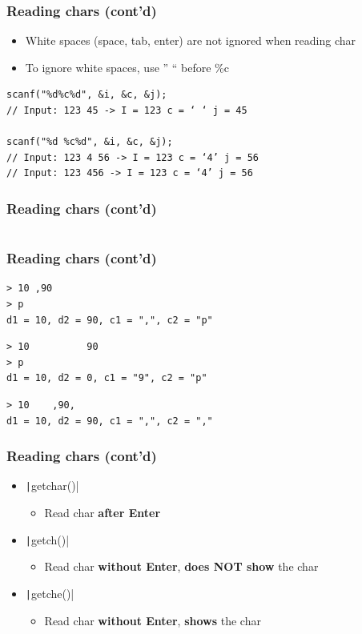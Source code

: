 \documentclass{../c-lecture}
\begin{document}
\begin{frame}[fragile]
  \frametitle{Reading chars (cont’d)}
  \begin{itemize}
    \item White spaces (space, tab, enter) are not ignored when reading char
    \item To ignore white spaces, use '' `` before \%c
  \end{itemize}
  \begin{verbatim}
scanf("%d%c%d", &i, &c, &j);
// Input: 123 45 -> I = 123 c = ‘ ‘ j = 45

scanf("%d %c%d", &i, &c, &j);
// Input: 123 4 56 -> I = 123 c = ‘4’ j = 56
// Input: 123 456 -> I = 123 c = ‘4’ j = 56
  \end{verbatim}
\end{frame}

\begin{frame}[fragile]
  \frametitle{Reading chars (cont’d)}
  \scriptsize
  \inputminted[bgcolor=Black]{c}{./src/read-with-whitespaces.c}
\end{frame}

\begin{frame}[fragile]
  \frametitle{Reading chars (cont’d)}
  \begin{verbatim}
> 10 ,90
> p
d1 = 10, d2 = 90, c1 = ",", c2 = "p"
  \end{verbatim}
  \begin{verbatim}
> 10          90
> p
d1 = 10, d2 = 0, c1 = "9", c2 = "p"
  \end{verbatim}
  \begin{verbatim}
> 10    ,90,
d1 = 10, d2 = 90, c1 = ",", c2 = ","
  \end{verbatim}
\end{frame}

\begin{frame}
  \frametitle{Reading chars (cont’d)}
  \begin{itemize}
    \item \texttt|getchar()|
    \begin{itemize}
      \item Read char \textbf{\color{Orange} after Enter}
    \end{itemize}
    \item \texttt|getch()|
    \begin{itemize}
      \item
        Read char \textbf{\color{Orange} without Enter},
        \textbf{\color{LimeGreen} does NOT show} the char
    \end{itemize}
    \item \texttt|getche()|
    \begin{itemize}
      \item
        Read char \textbf{\color{Orange} without Enter},
        \textbf{\color{LimeGreen} shows} the char
    \end{itemize}
  \end{itemize}
\end{frame}
\end{document}

